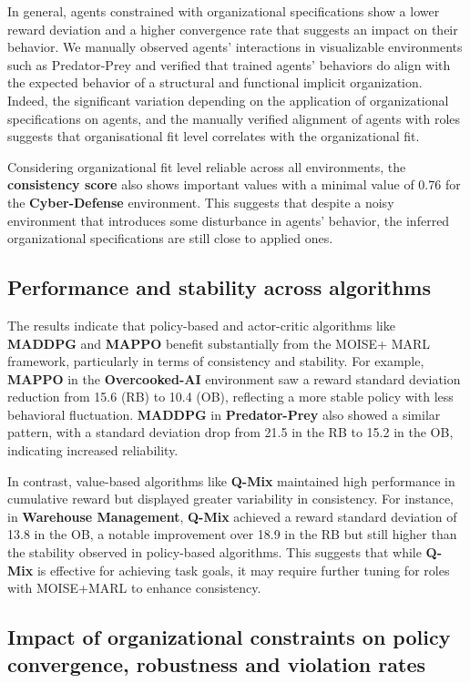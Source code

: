 \documentclass[sigconf]{aamas}
\begin{document}
In general, agents constrained with organizational specifications show a lower reward deviation and a higher convergence rate that suggests an impact on their behavior. We manually observed agents' interactions in visualizable environments such as Predator-Prey and verified that trained agents' behaviors do align with the expected behavior of a structural and functional implicit organization.
%
Indeed, the significant variation depending on the application of organizational specifications on agents, and the manually verified alignment of agents with roles suggests that organisational fit level correlates with the organizational fit.

Considering organizational fit level reliable across all environments, the \textbf{consistency score} also shows important values with a minimal value of 0.76 for the \textbf{Cyber-Defense} environment. This suggests that despite a noisy environment that introduces some disturbance in agents' behavior, the inferred organizational specifications are still close to applied ones.

\subsection{Performance and stability across algorithms}

The results indicate that policy-based and actor-critic algorithms like \textbf{MADDPG} and \textbf{MAPPO} benefit substantially from the MOISE+ MARL framework, particularly in terms of consistency and stability. For example, \textbf{MAPPO} in the \textbf{Overcooked-AI} environment saw a reward standard deviation reduction from 15.6 (RB) to 10.4 (OB), reflecting a more stable policy with less behavioral fluctuation. \textbf{MADDPG} in \textbf{Predator-Prey} also showed a similar pattern, with a standard deviation drop from 21.5 in the RB to 15.2 in the OB, indicating increased reliability.

In contrast, value-based algorithms like \textbf{Q-Mix} maintained high performance in cumulative reward but displayed greater variability in consistency. For instance, in \textbf{Warehouse Management}, \textbf{Q-Mix} achieved a reward standard deviation of 13.8 in the OB, a notable improvement over 18.9 in the RB but still higher than the stability observed in policy-based algorithms. This suggests that while \textbf{Q-Mix} is effective for achieving task goals, it may require further tuning for roles with MOISE+MARL to enhance consistency.

\subsection{Impact of organizational constraints on policy convergence, robustness and violation rates}
\end{document}

